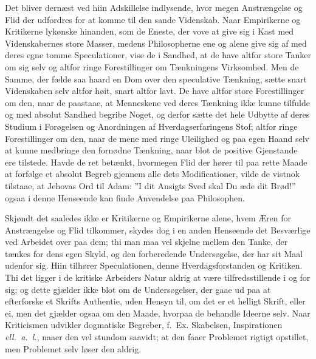 \documentclass[12pt]{book}
\newcommand{\opage}[1]{\marginnote{\footnotesize\textit{[#1]}}}
\begin{document}
Det bliver dernæst ved hiin Adskillelse indlysende, hvor megen
Anstrængelse og Flid der udfordres for at komme til den sande
Videnskab. Naar Empirikerne og Kritikerne lykønske hinanden, som de
Eneste, der vove at give sig i Kast med Videnskabernes store Masser,
medens Philosopherne ene og alene give sig af med deres egne tomme
Speculationer, vise de i Sandhed, at de have altfor store Tanker om
sig selv og altfor ringe Forestillinger om Tænkningens Virksomhed. Men
de Samme, der fælde saa haard en Dom over den speculative Tænkning,
sætte snart Videnskaben selv altfor høit, snart altfor lavt. De have
altfor store Forestillinger om den, naar de paastaae, at Menneskene
ved deres Tænkning ikke kunne tilfulde og med absolut Sandhed begribe
Noget, og derfor sætte det hele Udbytte af deres Studium i Forøgelsen
og Anordningen af Hverdagserfaringens Stof; altfor ringe Forestillinger
om den, naar de mene med ringe Uleilighed og paa egen Haand selv at
kunne medbringe den fornødne Tænkning, naar blot de positive
Gjenstande ere tilstede. Havde de ret betænkt, hvormegen Flid der
hører til paa rette Maade at forfølge et absolut Begreb gjennem alle
dets Modificationer, vilde de vistnok tilstaae, at Jehovas Ord til
Adam: ”I dit Ansigts Sved skal Du æde dit Brød!” ogsaa i denne
Henseende kan finde Anvendelse paa Philosophen.

Skjøndt det saaledes ikke er Kritikerne og Empirikerne alene, hvem
Æren for Anstrængelse og Flid tilkommer, skydes dog i en anden
Henseende det Besværlige ved Arbeidet over paa dem; thi man maa vel
skjelne mellem den Tanke, der tænkes for dens egen Skyld, og den
forberedende Undersøgelse, der har sit Maal udenfor sig. Hiin tilhører
Speculationen,
\opage{35} denne Hverdagsforstanden og Kritiken. Thi det ligger i de kritiske
Arbeiders Natur aldrig at være tilfredsstillende i og for sig; og
dette gjælder ikke blot om de Undersøgelser, der gaae ud paa at
efterforske et Skrifts Authentie, uden Hensyn til, om det er et
helligt Skrift, eller ei, men det gjælder ogsaa om den Maade, hvorpaa
de behandle Ideerne selv. Naar Kriticismen udvikler dogmatiske
Begreber, f.~Ex. Skabelsen, Inspirationen \textit{ell.~a.~l.}, naaer
den vel stundom saavidt; at den faaer Problemet rigtigt opstillet, men
Problemet selv løser den aldrig.
\end{document}
